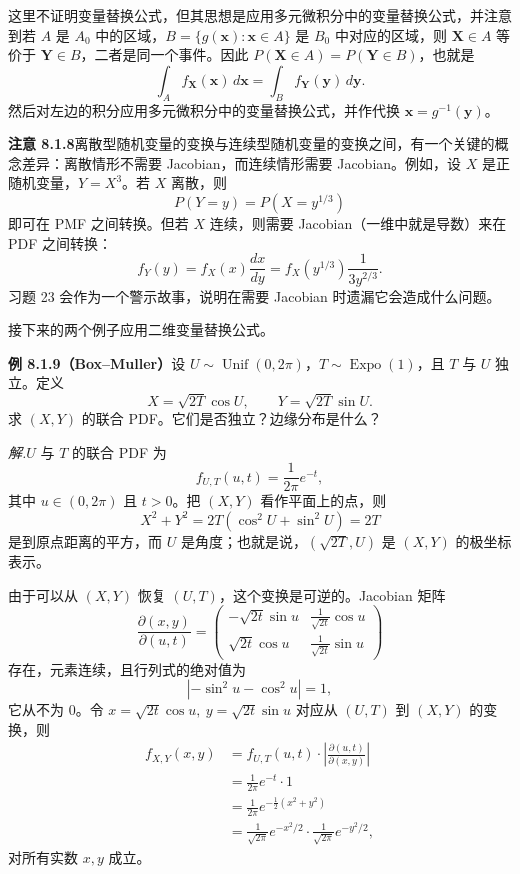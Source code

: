 \documentclass[UTF8, 12pt, fontset=fandol, oneside]{ctexart}
\begin{document}
这里不证明变量替换公式，但其思想是应用多元微积分中的变量替换公式，并注意到若 $A$ 是 $A_0$ 中的区域，$B=\{g(\mathbf x):\mathbf x\in A\}$ 是 $B_0$ 中对应的区域，则 $\mathbf X\in A$ 等价于 $\mathbf Y\in B$，二者是同一个事件。因此 $P(\mathbf X\in A)=P(\mathbf Y\in B)$，也就是
\[
  \int_A f_{\mathbf X}(\mathbf x)\,d\mathbf x
  =
  \int_B f_{\mathbf Y}(\mathbf y)\,d\mathbf y.
\]
然后对左边的积分应用多元微积分中的变量替换公式，并作代换 $\mathbf x=g^{-1}(\mathbf y)$。

\noindent\textbf{注意 8.1.8}\quad 离散型随机变量的变换与连续型随机变量的变换之间，有一个关键的概念差异：离散情形不需要 Jacobian，而连续情形需要 Jacobian。例如，设 $X$ 是正随机变量，$Y=X^3$。若 $X$ 离散，则
\[
  P(Y=y)=P(X=y^{1/3})
\]
即可在 PMF 之间转换。但若 $X$ 连续，则需要 Jacobian（一维中就是导数）来在 PDF 之间转换：
\[
  f_Y(y)=f_X(x)\frac{dx}{dy}
  =f_X(y^{1/3})\frac{1}{3y^{2/3}}.
\]
习题 23 会作为一个警示故事，说明在需要 Jacobian 时遗漏它会造成什么问题。

接下来的两个例子应用二维变量替换公式。

\noindent\textbf{例 8.1.9（Box--Muller）}\quad 设 $U\sim\operatorname{Unif}(0,2\pi)$，$T\sim\operatorname{Expo}(1)$，且 $T$ 与 $U$ 独立。定义
\[
  X=\sqrt{2T}\cos U,\qquad Y=\sqrt{2T}\sin U.
\]
求 $(X,Y)$ 的联合 PDF。它们是否独立？边缘分布是什么？

\noindent\textit{解.}\quad $U$ 与 $T$ 的联合 PDF 为
\[
  f_{U,T}(u,t)=\frac{1}{2\pi}e^{-t},
\]
其中 $u\in(0,2\pi)$ 且 $t>0$。把 $(X,Y)$ 看作平面上的点，则
\[
  X^2+Y^2=2T(\cos^2U+\sin^2U)=2T
\]
是到原点距离的平方，而 $U$ 是角度；也就是说，$(\sqrt{2T},U)$ 是 $(X,Y)$ 的极坐标表示。

由于可以从 $(X,Y)$ 恢复 $(U,T)$，这个变换是可逆的。Jacobian 矩阵
\[
  \frac{\partial(x,y)}{\partial(u,t)}
  =
  \begin{pmatrix}
    -\sqrt{2t}\sin u & \frac{1}{\sqrt{2t}}\cos u\\
    \sqrt{2t}\cos u & \frac{1}{\sqrt{2t}}\sin u
  \end{pmatrix}
\]
存在，元素连续，且行列式的绝对值为
\[
  |-\sin^2u-\cos^2u|=1,
\]
它从不为 $0$。令 $x=\sqrt{2t}\cos u,\ y=\sqrt{2t}\sin u$ 对应从 $(U,T)$ 到 $(X,Y)$ 的变换，则
\[
\begin{aligned}
  f_{X,Y}(x,y)
  &=f_{U,T}(u,t)\cdot\left|\frac{\partial(u,t)}{\partial(x,y)}\right|\\
  &=\frac{1}{2\pi}e^{-t}\cdot 1\\
  &=\frac{1}{2\pi}e^{-\frac12(x^2+y^2)}\\
  &=\frac{1}{\sqrt{2\pi}}e^{-x^2/2}\cdot
    \frac{1}{\sqrt{2\pi}}e^{-y^2/2},
\end{aligned}
\]
对所有实数 $x,y$ 成立。
\end{document}
